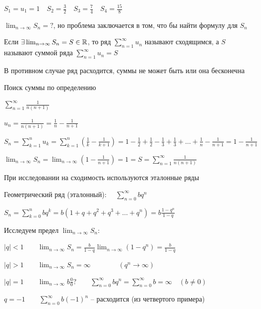 \documentclass[12pt]{article}
\begin{document}
    $S_1 = u_1 = 1 \quad S_2 = \frac{3}{2} \quad S_3 = \frac{7}{4} \quad S_4 = \frac{15}{8}$

    $\lim_{n \to \infty} S_n = ?$, но проблема заключается в том, что бы найти формулу для $S_n$

    \hypertarget{sumofseriesdefinition}{}
    \hypertarget{seriesconvergence}{}

    \Def Если $\exists \lim_{n \to\infty} S_n = S \in \mathbb{R}$, то ряд $\sum_{n = 1}^\infty u_n$ называют сходящимся,
    а $S$ называют суммой ряда $\sum_{n = 1}^\infty u_n = S$

    \Notas В противном случае ряд расходится, суммы не может быть или она бесконечна

    \Ex Поиск суммы по определению

    $\sum_{n = 1}^\infty \frac{1}{n (n + 1)}$

    $u_n = \frac{1}{n(n + 1)} = \frac{1}{n} - \frac{1}{n + 1}$

    $S_n = \sum_{k = 1}^n u_k = \sum_{k = 1}^n \left(\frac{1}{k} - \frac{1}{k + 1}\right) = 1 - \frac{1}{2} + \frac{1}{2} - \frac{1}{3} + \frac{1}{3} + \dots + \frac{1}{n} - \frac{1}{n + 1} = 1 - \frac{1}{n + 1}$

    $\lim_{n \to \infty} S_n = \lim_{n \to \infty} \left(1 - \frac{1}{n + 1}\right) = 1 = S = \sum_{n = 1}^\infty \frac{1}{n(n + 1)}$

    \hypertarget{referenceseries}{}
    
    \Nota При исследовании на сходимость используются эталонные ряды

    \hypertarget{geometricseries}{}

    \Ex Геометрический ряд (эталонный): \ \ $\sum_{n = 0}^\infty b q^n$

    $S_n = \sum_{k = 0}^n b q^k = b (1 + q + q^2 + q^3 + \dots + q^n) = b \frac{1 - q^n}{1 - q}$

    Исследуем предел $\lim_{n\to\infty} S_n$:

    $|q| < 1 \quad\quad \lim_{n\to\infty} S_n = \frac{b}{1 - q} \lim_{n \to\infty} (1 - q^n) = \frac{b}{1 - q}$

    $|q| > 1 \quad\quad \lim_{n\to\infty} S_n = \infty \qquad\qquad (q^n \to\infty)$

    $|q| = 1 \quad\quad \lim_{n\to\infty} b \frac{0}{0} ? \quad\quad \sum_{n = 0}^\infty b q^n = \sum_{n = 0}^\infty b = \infty \quad (b \neq 0)$

    $q = -1 \quad\quad \sum_{n = 0}^\infty b (-1)^n$ -- расходится (из четвертого примера)
\end{document}
